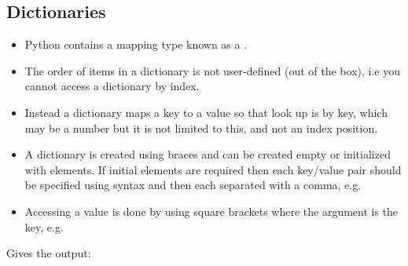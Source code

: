 \documentclass[letterpaper,10pt,english,openany]{sphinxmanual}
\begin{document}
\subsection{Dictionaries}
\label{\detokenize{introduction_to_python/more_sequence_types:dictionaries}}\begin{itemize}
\item {} 
Python contains a mapping type known as a .

\item {} 
The order of items in a dictionary is not user-defined (out of the
box), i.e you cannot access a dictionary by index.

\item {} 
Instead a dictionary maps a key to a value so that look up is by key,
which may be a number but it is not limited to this, and not an index
position.

\item {} 
A dictionary is created using braces \sphinxcode{\sphinxupquote{\{\}}} and can be created empty
or initialized with elements. If initial elements are required then
each key/value pair should be specified using  syntax
and then each separated with a comma, e.g.

\item {} 
Accessing a value is done by using square brackets where the argument
is the key, e.g.

\end{itemize}
\begin{quote}

\begin{sphinxVerbatim}[commandchars=\\\{\}]
        
        
\PYG{p}{[}\PYG{p}{]}
\end{sphinxVerbatim}
\end{quote}

Gives the output:
\end{document}
